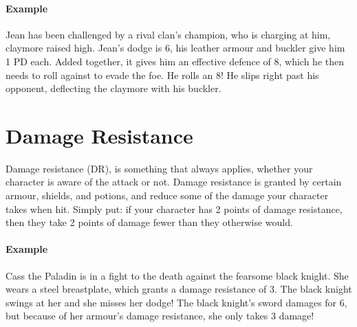 \paragraph{Example} Jean has been challenged by a rival clan's champion, who is charging at him, claymore raised high.
Jean's dodge is 6, his leather armour and buckler give him 1 PD each.
Added together, it gives him an effective defence of 8, which he then needs to roll against to evade the foe.
He rolls an 8! He slips right past his opponent, deflecting the claymore with his buckler.

\section{Damage Resistance}\label{sec:damage-resistance}
Damage resistance (DR), is something that always applies, whether your character is aware of the attack or not.
Damage resistance is granted by certain armour, shields, and potions, and reduce some of the damage your character takes when hit.
Simply put: if your character has 2 points of damage resistance, then they take 2 points of damage fewer than they otherwise would.

\paragraph{Example} Cass the Paladin is in a fight to the death against the fearsome black knight.
She wears a steel breastplate, which grants a damage resistance of 3.
The black knight swings at her and she misses her dodge!
The black knight's sword damages for 6, but because of her armour's damage resistance, she only takes 3 damage!
